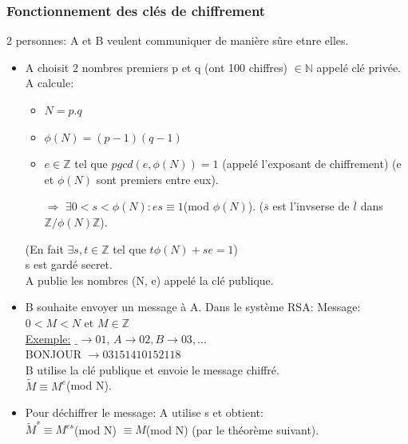 \documentclass[11pt]{article}
\begin{document}
				\subsubsection{Fonctionnement des clés de chiffrement}
					2 personnes: A et B veulent communiquer de manière sûre etnre elles.
					\begin{itemize}
			 			\item A choisit 2 nombres premiers p et q (ont 100 chiffres) $\in \mathbb{N}$ appelé clé privée.
						A calcule:
						\begin{itemize}
							 \item $N = p.q$
							 \item $\phi(N) = (p-1)(q-1)$
							 \item $e \in \mathbb{Z}$ tel que $pgcd(e, \phi(N)) = 1$ (appelé l'exposant de chiffrement) (e et $\phi(N)$ sont premiers entre eux).
							 \item[$\Rightarrow$] $\exists 0 < s < \phi(N): es \equiv 1$(mod $\phi(N)$). ($\overline{s}$ est l'invserse de $\overline{l}$ dans $\mathbb{Z}/\phi(N)\mathbb{Z}$).
						\end{itemize}
						(En fait $\exists s, t \in \mathbb{Z}$ tel que $t \phi(N) + se = 1$)\\
						s est gardé secret.\\
						A publie les nombres (N, e) appelé la clé publique.
					 \item B souhaite envoyer un message à A.  Dans le système RSA: Message: $0 < M < N$ et $M \in \mathbb{Z}$\\
					\underline{Exemple:} $\_ \rightarrow 01$, $A \rightarrow 02, B \rightarrow 03, ...$\\
					BONJOUR $\rightarrow 03151410152118$ \\
					B utilise la clé publique et envoie le message chiffré.\\
					$\tilde{M} \equiv M^e$(mod N).
			 
					 \item Pour déchiffrer le message: A utilise s et obtient:\\
					$\tilde{M}^s \equiv M^{es}$(mod N)
					$\equiv M$(mod N) (par le théorème suivant).
				

\end{itemize}
\end{document}

